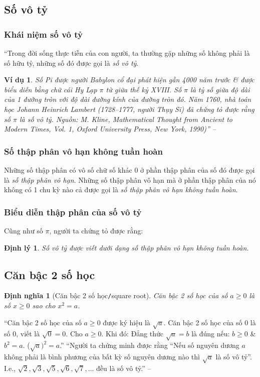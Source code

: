 \documentclass[oneside]{book}
\numberwithin{equation}{section}
\newtheorem{dinhnghia}{Định nghĩa}[section]
\newtheorem{vidu}{Ví dụ}[section]
\newtheorem{dinhly}{Định lý}[section]
\begin{document}
\subsection{Số vô tỷ}

\subsubsection{Khái niệm số vô tỷ}
``Trong đời sống thực tiễn của con người, ta thường gặp những số không phải là số hữu tỷ, những số đó được gọi là \textit{số vô tỷ}.

\begin{vidu}
	Số Pi được người Babylon cổ đại phát hiện gần 4000 năm trước \& được biểu diễn bằng chữ cái Hy Lạp $\pi$ từ giữa thế kỷ XVIII. Số $\pi$ là tỷ số giữa độ dài của 1 đường tròn với độ dài đường kính của đường tròn đó. Năm 1760, nhà toán học Johann Heinrich Lambert (1728--1777, người Thụy Sĩ) đã chứng tỏ được rằng số $\pi$ là số vô tỷ. Nguồn: M. Kline, \textit{Mathematical Thought from Ancient to Modern Times}, Vol. 1, Oxford University Press, New York, 1990)'' -- \cite[p. 32]{SGK_Toan_7_Canh_Dieu_tap_1}
\end{vidu}

\subsubsection{Số thập phân vô hạn không tuần hoàn}
Những số thập phân có vô số chữ số khác $0$ ở phần thập phân của số đó được gọi là \textit{số thập phân vô hạn}. Những số thập phân vô hạn mà ở phần thập phân của nó không có 1 chu kỳ nào cả được gọi là \textit{số thập phân vô hạn không tuần hoàn}.

\subsubsection{Biểu diễn thập phân của số vô tỷ}
Cũng như số $\pi$, người ta chứng tỏ được rằng:

\begin{dinhly}
	Số vô tỷ được viết dưới dạng số thập phân vô hạn không tuần hoàn.
\end{dinhly}

\subsection{Căn bậc 2 số học}

\begin{dinhnghia}[Căn bậc 2 số học\texttt{/}square root]
	\emph{Căn bậc 2 số học} của số $a\ge 0$ là số $x\ge 0$ sao cho $x^2 = a$.
\end{dinhnghia}
``Căn bậc 2 số học của số $a\ge 0$ được ký hiệu là $\sqrt{a}$. Căn bậc 2 số học của số $0$ là số $0$, viết là $\sqrt{0} = 0$. Cho $a\ge 0$. Khi đó: Đẳng thức $\sqrt{a} = b$ là đúng nếu: $b\ge 0$ \& $b^2 = a$. ($\sqrt{a})^2 = a$.'' ``Người ta chứng minh được rằng ``Nếu số nguyên dương $a$ không phải là bình phương của bất kỳ số nguyên dương nào thì $\sqrt{a}$ là số vô tỷ''. I.e., $\sqrt{2},\sqrt{3},\sqrt{5},\sqrt{6},\sqrt{7},\ldots$ đều là số vô tỷ.'' -- \cite[p. 34]{SGK_Toan_7_Canh_Dieu_tap_1}
\end{document}

